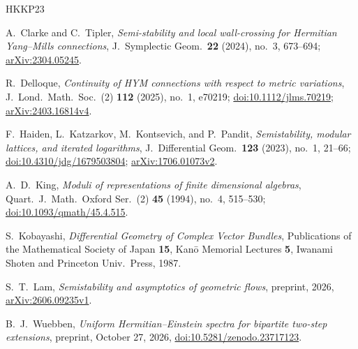 \begin{thebibliography}{HKKP23}

A.~Clarke and C.~Tipler,
\emph{Semi-stability and local wall-crossing for Hermitian Yang--Mills connections},
J.\ Symplectic Geom.\ \textbf{22} (2024), no.~3, 673--694;
\href{https://arxiv.org/abs/2304.05245}{arXiv:2304.05245}.

R.~Delloque,
\emph{Continuity of HYM connections with respect to metric variations},
J.\ Lond.\ Math.\ Soc.\ (2) \textbf{112} (2025), no.~1, e70219;
\href{https://doi.org/10.1112/jlms.70219}{doi:10.1112/jlms.70219};
\href{https://arxiv.org/abs/2403.16814v4}{arXiv:2403.16814v4}.

F.~Haiden, L.~Katzarkov, M.~Kontsevich, and P.~Pandit,
\emph{Semistability, modular lattices, and iterated logarithms},
J.\ Differential Geom.\ \textbf{123} (2023), no.~1, 21--66;
\href{https://doi.org/10.4310/jdg/1679503804}{doi:10.4310/jdg/1679503804};
\href{https://arxiv.org/abs/1706.01073v2}{arXiv:1706.01073v2}.

A.~D.~King,
\emph{Moduli of representations of finite dimensional algebras},
Quart.\ J.\ Math.\ Oxford Ser.\ (2) \textbf{45} (1994), no.~4, 515--530;
\href{https://doi.org/10.1093/qmath/45.4.515}{doi:10.1093/qmath/45.4.515}.

S.~Kobayashi,
\emph{Differential Geometry of Complex Vector Bundles},
Publications of the Mathematical Society of Japan \textbf{15},
Kan\=o Memorial Lectures \textbf{5}, Iwanami Shoten and Princeton
Univ.\ Press, 1987.

S.~T.~Lam,
\emph{Semistability and asymptotics of geometric flows},
preprint, 2026, \href{https://arxiv.org/abs/2606.09235v1}{arXiv:2606.09235v1}.

B.~J.~Wuebben,
\emph{Uniform Hermitian--Einstein spectra for bipartite two-step extensions},
preprint, October 27, 2026,
\href{https://doi.org/10.5281/zenodo.23717123}{doi:10.5281/zenodo.23717123}.

\end{thebibliography}
